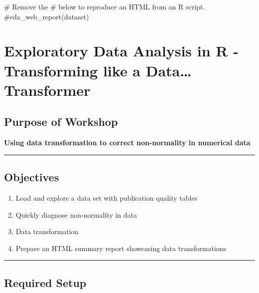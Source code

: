 \documentclass[
  letterpaper,
  DIV=11,
  numbers=noendperiod]{scrreprt}
\newenvironment{Shaded}{\begin{snugshade}}{\end{snugshade}}
\newcommand{\CommentTok}[1]{\textcolor[rgb]{0.37,0.37,0.37}{#1}}
\providecommand{\tightlist}{%
  \setlength{\itemsep}{0pt}\setlength{\parskip}{0pt}}\usepackage{longtable,booktabs,array}
\begin{document}
\begin{Shaded}
\begin{Highlighting}[]
\CommentTok{\# Remove the \textquotesingle{}\#\textquotesingle{} below to reproduce an HTML from an R script. }
\CommentTok{\#eda\_web\_report(dataset)}
\end{Highlighting}
\end{Shaded}


\hypertarget{exploratory-data-analysis-in-r---transforming-like-a-data-transformer-1}{%
\chapter{Exploratory Data Analysis in R - Transforming like a
Data\ldots{}
Transformer}\label{exploratory-data-analysis-in-r---transforming-like-a-data-transformer-1}}

\hypertarget{purpose-of-workshop-3}{%
\section{Purpose of Workshop}\label{purpose-of-workshop-3}}

\textbf{Using data transformation to correct non-normality in numerical
data}

\begin{center}\rule{0.5\linewidth}{0.5pt}\end{center}

\hypertarget{objectives-2}{%
\section{Objectives}\label{objectives-2}}

\begin{enumerate}
\def\labelenumi{\arabic{enumi}.}
\tightlist
\item
  Load and explore a data set with publication quality tables
\item
  Quickly diagnose non-normality in data
\item
  Data transformation
\item
  Prepare an HTML summary report showcasing data transformations
\end{enumerate}

\begin{center}\rule{0.5\linewidth}{0.5pt}\end{center}

\hypertarget{required-setup-2}{%
\section{Required Setup}\label{required-setup-2}}
\end{document}
